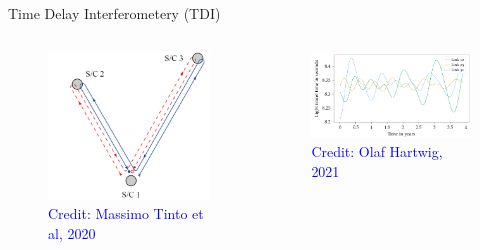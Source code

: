 \documentclass[pdf]{beamer}
\newcommand{\credit}[1]{\tiny{\textcolor{blue}{Credit: #1}}}
\begin{document}
\begin{frame}{Time Delay Interferometery (TDI)}
\begin{columns}
\begin{figure}
\includegraphics[scale=.15]{fig/LISAschem.png}
\caption*{\credit{Massimo Tinto et al, 2020}}
\end{figure}
\begin{figure}
\includegraphics[scale=.15]{fig/Distance.png}
\caption*{\credit{Olaf Hartwig, 2021}}
\end{figure}
\end{columns}
\end{frame}
\end{document}
